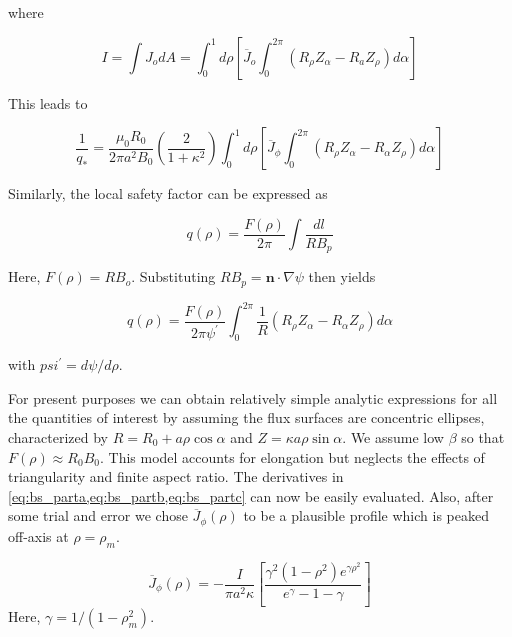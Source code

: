 where

\begin{equation}
I = \int J _ { o } d A = \int _ { 0 } ^ { 1 } d \rho \left[ \overline { J } _ { o } \int _ { 0 } ^ { 2 \pi } \left( R _ { \rho } Z _ { \alpha } - R _ { a } Z _ { \rho } \right) d \alpha \right]
\end{equation}

This leads to 

\begin{equation}
\label{eq:bs_partb}
\frac { 1 } { q _ { * } } = \frac { \mu _ { 0 } R _ { 0 } } { 2 \pi a ^ { 2 } B _ { 0 } } \left( \frac { 2 } { 1 + \kappa ^ { 2 } } \right) \int _ { 0 } ^ { 1 } d \rho \left[ \overline { J } _ { \phi } \int _ { 0 } ^ { 2 \pi } \left( R _ { \rho } Z _ { \alpha } - R _ { \alpha } Z _ { \rho } \right) d \alpha \right]
\end{equation}

Similarly, the local safety factor can be expressed as

\begin{equation}
q ( \rho ) = \frac { F ( \rho ) } { 2 \pi } \int \frac { d l } { R B _ { p } }
\end{equation}

Here, $F ( \rho ) = R B _ { o }$. Substituting $R B _ { p } = \mathbf { n } \cdot \nabla \psi$ then yields

\begin{equation}
\label{eq:bs_partc}
q ( \rho ) = \frac { F ( \rho ) } { 2 \pi \psi ^ { \prime } } \int _ { 0 } ^ { 2 \pi } \frac { 1 } { R } \left( R _ { \rho } Z _ { \alpha } - R _ { \alpha } Z _ { \rho } \right) d \alpha	
\end{equation}

with $psi ^ { \prime } = d \psi / d \rho$.

For present purposes we can obtain relatively simple analytic expressions for all the quantities of interest by assuming the flux surfaces are concentric ellipses, characterized by $R = R _ { 0 } + a \rho \cos \alpha$ and $Z = \kappa a \rho \sin \alpha$. We assume low $\beta$ so that $F ( \rho ) \approx R _ { 0 } B _ { 0 }$. This model accounts for elongation but neglects the effects of triangularity and finite aspect ratio. The derivatives in \cref{eq:bs_parta,eq:bs_partb,eq:bs_partc} can now be easily evaluated. Also, after some trial and error we chose $\overline { J } _ { \phi } ( \rho )$ to be a plausible profile which is peaked off-axis at $\rho = \rho_m$.

\begin{equation}
	\overline { J } _ { \phi } ( \rho ) = - \frac { I } { \pi a ^ { 2 } \kappa } \left[ \frac { \gamma ^ { 2 } \left( 1 - \rho ^ { 2 } \right) e ^ { \gamma \rho ^ { 2 } } } { e ^ { \gamma } - 1 - \gamma } \right]
\end{equation}
Here, $\gamma = 1 / ( 1 - \rho_m^2 )$. 

